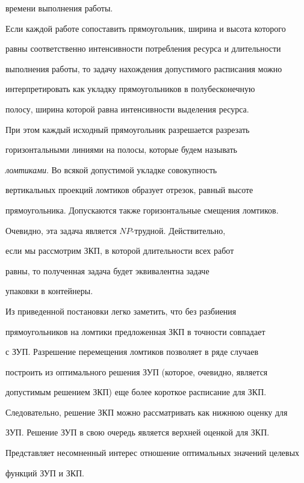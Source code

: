времени выполнения работы.





Если каждой работе сопоставить прямоугольник, ширина и высота которого


равны соответственно интенсивности потребления ресурса и длительности


выполнения работы, то задачу нахождения допустимого расписания можно


интерпретировать как укладку прямоугольников в полубесконечную


полосу, ширина которой равна интенсивности выделения ресурса.


При этом каждый исходный прямоугольник разрешается разрезать 


горизонтальными линиями на полосы, которые будем называть 


{\it ломтиками}. Во всякой допустимой укладке совокупность


вертикальных проекций ломтиков образует отрезок, равный высоте


прямоугольника. Допускаются также горизонтальные смещения ломтиков.


Очевидно, эта задача является $NP$-трудной. Действительно,


если мы рассмотрим ЗКП, в которой длительности всех работ


равны, то полученная задача будет эквивалентна задаче


упаковки в контейнеры.





Из приведенной постановки легко заметить, что без разбиения


прямоугольников на ломтики предложенная ЗКП в точности совпадает


с ЗУП. Разрешение перемещения ломтиков позволяет в ряде случаев


построить из оптимального решения ЗУП (которое, очевидно, является


допустимым решением ЗКП) еще более короткое расписание для ЗКП.


Следовательно, решение ЗКП можно рассматривать как нижнюю оценку для


ЗУП. Решение ЗУП в свою очередь является верхней оценкой для ЗКП.


Представляет несомненный интерес отношение оптимальных значений целевых


функций ЗУП и ЗКП.





